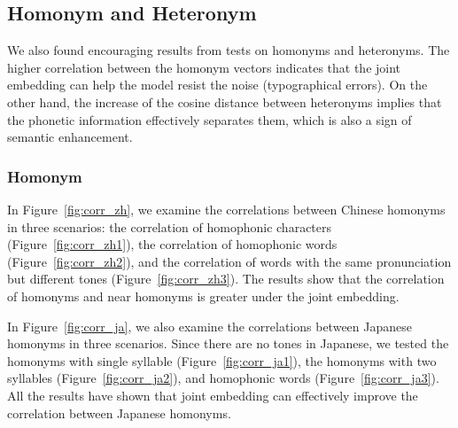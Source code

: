 \subsection{Homonym and Heteronym} \label{sec:analysis_homonym_heteronym}

We also found encouraging results from tests on homonyms and heteronyms. The higher correlation between the homonym vectors indicates that the joint embedding can help the model resist the noise (typographical errors). On the other hand, the increase of the cosine distance between heteronyms implies that the phonetic information effectively separates them, which is also a sign of semantic enhancement.

\subsubsection{Homonym}

In Figure~\ref{fig:corr_zh}, we examine the correlations between Chinese homonyms in three scenarios: the correlation of homophonic characters (Figure~\ref{fig:corr_zh1}), the correlation of homophonic words (Figure~\ref{fig:corr_zh2}), and the correlation of words with the same pronunciation but different tones (Figure~\ref{fig:corr_zh3}). The results show that the correlation of homonyms and near homonyms is greater under the joint embedding.

In Figure~\ref{fig:corr_ja}, we also examine the correlations between Japanese homonyms in three scenarios. Since there are no tones in Japanese, we tested the homonyms with single syllable (Figure~\ref{fig:corr_ja1}), the homonyms with two syllables (Figure~\ref{fig:corr_ja2}), and homophonic words (Figure~\ref{fig:corr_ja3}). All the results have shown that joint embedding can effectively improve the correlation between Japanese homonyms.

